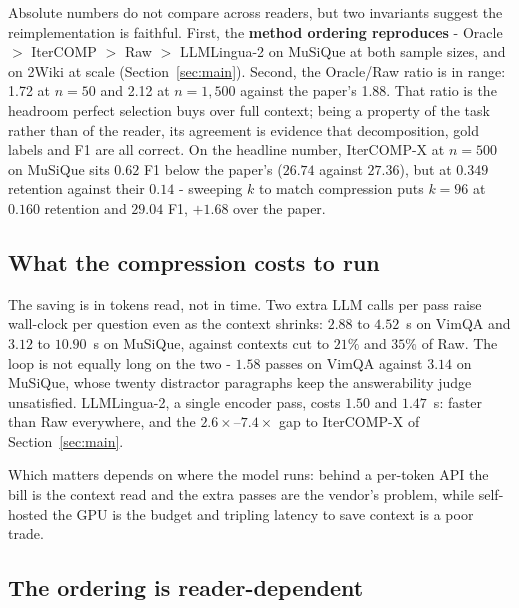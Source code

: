 \documentclass{llncs}
\begin{document}
Absolute numbers do not compare across readers, but two invariants suggest the
reimplementation is faithful. First, the \textbf{method ordering reproduces} -
Oracle $>$ IterCOMP $>$ Raw $>$ LLMLingua-2 on MuSiQue at both sample sizes, and
on 2Wiki at scale (Section~\ref{sec:main}). Second, the Oracle/Raw ratio is in
range: 1.72 at $n=50$ and 2.12 at $n=1{,}500$ against the paper's 1.88. That
ratio is the headroom perfect selection buys over full context; being a property
of the task rather than of the reader, its agreement is evidence that
decomposition, gold labels and F1 are all correct. On the headline number,
IterCOMP-X at $n=500$ on MuSiQue sits $0.62$ F1 below the paper's ($26.74$
against $27.36$), but at $0.349$ retention against their $0.14$ - sweeping $k$ to
match compression puts $k=96$ at $0.160$ retention and $29.04$ F1, $+1.68$ over
the paper.

\subsection{What the compression costs to run}
\label{sec:cost}

The saving is in tokens read, not in time. Two extra LLM calls per pass raise
wall-clock per question even as the context shrinks: $2.88$ to $4.52$~s on VimQA
and $3.12$ to $10.90$~s on MuSiQue, against contexts cut to $21\%$ and $35\%$ of
Raw. The loop is not equally long on the two - $1.58$ passes on VimQA against
$3.14$ on MuSiQue, whose twenty distractor paragraphs keep the answerability
judge unsatisfied. LLMLingua-2, a single encoder pass, costs $1.50$ and
$1.47$~s: faster than Raw everywhere, and the $2.6\times$--$7.4\times$ gap to
IterCOMP-X of Section~\ref{sec:main}.

Which matters depends on where the model runs: behind a per-token API the bill is
the context read and the extra passes are the vendor's problem, while self-hosted
the GPU is the budget and tripling latency to save context is a poor trade.

\subsection{The ordering is reader-dependent}
\label{sec:reader}
\end{document}
